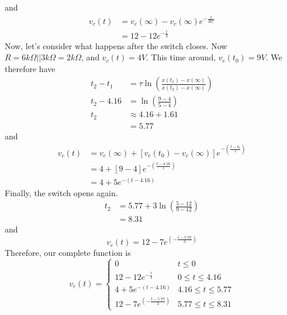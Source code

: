 \documentclass[nobib]{tufte-handout}
\begin{document}
and
\begin{align}
    v_c(t) &= v_c(\infty) - v_c(\infty)e^{-\frac{t}{RC}} \\
    &= 12 - 12e^{-\frac{t}{3}}
\end{align}
Now, let's consider what happens after the switch closes. 
Now $R = 6k\Omega || 3k\Omega = 2k\Omega$, and $v_c(t) = 4V$. 
This time around, $v_c(t_0) = 9V$. We therefore have 
\begin{align}
    t_2 - t_1 &= \tau \ln{\left(\frac{x(t_1) - x(\infty)}{x(t_2) - x(\infty)}\right)} \\
    t_2 - 4.16 &= \ln{\left(\frac{9-4}{5-4}\right)} \\
    t_2 &\approx 4.16 + 1.61 \\
    &= 5.77
\end{align}
and
\begin{align}
    v_c(t) &= v_c(\infty) + \left[v_c(t_0) - v_c(\infty)\right]e^{-\left(\frac{t-t_0}{\tau}\right)} \\
    &= 4 + \left[9 - 4\right]e^{-\left(\frac{t - 4.16}{1}\right)} \\
    &= 4 + 5e^{-(t - 4.16)}
\end{align}
Finally, the switch opens again. 
\begin{align}
    t_2 &= 5.77 + 3\ln{\left(\frac{5-12}{9-12}\right)} \\
    &= 8.31
\end{align}
and
\begin{equation}
    v_c(t) = 12 - 7e^{\left(-\frac{t-5.77}{3}\right)}
\end{equation}
Therefore, our complete function is 
\[v_c(t) = \begin{cases} 
      0 & t \leq 0 \\
      12 - 12e^{-\frac{t}{3}} & 0 \leq t \leq 4.16 \\
      4 + 5e^{-(t - 4.16)} & 4.16 \leq t \leq 5.77 \\
      12 - 7e^{\left(-\frac{t-5.77}{3}\right)} &  5.77 \leq t \leq 8.31
   \end{cases}
\]
\end{document}
